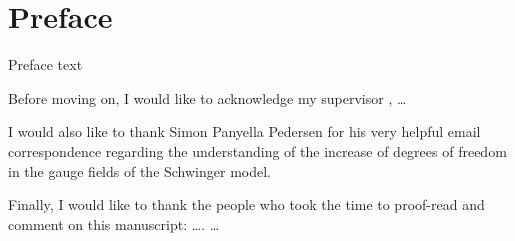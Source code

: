 \documentclass[../main.tex]{subfiles} %
\begin{document}
\chapter*{Preface}

Preface text


Before moving on, I would like to acknowledge my supervisor \Supervisor, \ldots

I would also like to thank Simon Panyella Pedersen for his very helpful email correspondence regarding the understanding of the increase of degrees of freedom in the gauge fields of the Schwinger model.

Finally, I would like to thank the people who took the time to proof-read and comment on this manuscript: \ldots. \ldots




\end{document}
